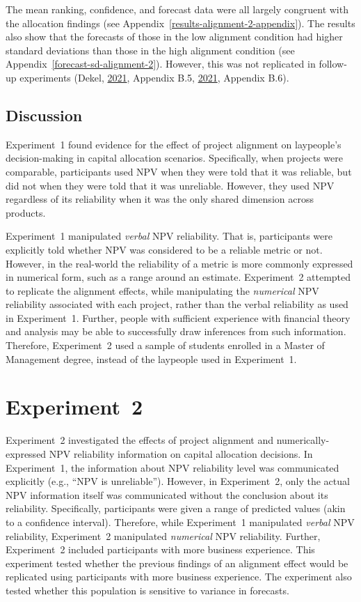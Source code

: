 \documentclass[
  english,
  man, donotrepeattitle,floatsintext]{apa7}
\theoremstyle{definition}
\theoremstyle{definition}
\theoremstyle{definition}
\theoremstyle{definition}
\theoremstyle{remark}
\begin{document}
The mean ranking, confidence, and forecast data were all largely congruent with
the allocation findings (see Appendix~\ref{results-alignment-2-appendix}). The
results also show that the forecasts of those in the low alignment condition had
higher standard deviations than those in the high alignment condition (see
Appendix~\ref{forecast-sd-alignment-2}). However, this was not replicated in
follow-up experiments (Dekel, \protect\hyperlink{ref-dekel2021b}{2021}, Appendix B.5, \protect\hyperlink{ref-dekel2021b}{2021}, Appendix B.6).

\hypertarget{discussion}{%
\subsection{Discussion}\label{discussion}}

Experiment~1 found evidence for the effect of project alignment on laypeople's
decision-making in capital allocation scenarios. Specifically, when projects
were comparable, participants used NPV when they were told that it was reliable, but
did not when they were told that it was unreliable. However, they used NPV
regardless of its reliability when it was the only shared dimension across products.

Experiment~1 manipulated \emph{verbal} NPV reliability. That is, participants were
explicitly told whether NPV was considered to be a reliable metric or not.
However, in the real-world the reliability of a metric is more commonly
expressed in numerical form, such as a range around an estimate. Experiment~2
attempted to replicate the alignment effects, while manipulating the \emph{numerical}
NPV reliability associated with each project, rather than the verbal reliability
as used in Experiment~1. Further, people with sufficient experience with
financial theory and analysis may be able to successfully draw inferences from
such information. Therefore, Experiment~2 used a sample of students enrolled in
a Master of Management degree, instead of the laypeople used in Experiment~1.

\hypertarget{alignment-3}{%
\section{Experiment~2}\label{alignment-3}}

Experiment~2 investigated the effects of project alignment and
numerically-expressed NPV reliability information on capital allocation
decisions. In Experiment~1, the information about NPV reliability level was
communicated explicitly (e.g., ``NPV is unreliable''). However, in Experiment~2,
only the actual NPV information itself was communicated without the conclusion
about its reliability. Specifically, participants were given a range of
predicted values (akin to a confidence interval). Therefore, while Experiment~1
manipulated \emph{verbal} NPV reliability, Experiment~2 manipulated \emph{numerical} NPV
reliability. Further, Experiment~2 included participants with more business
experience. This experiment tested whether the previous findings of an alignment
effect would be replicated using participants with more business experience. The
experiment also tested whether this population is sensitive to variance in
forecasts.
\end{document}
